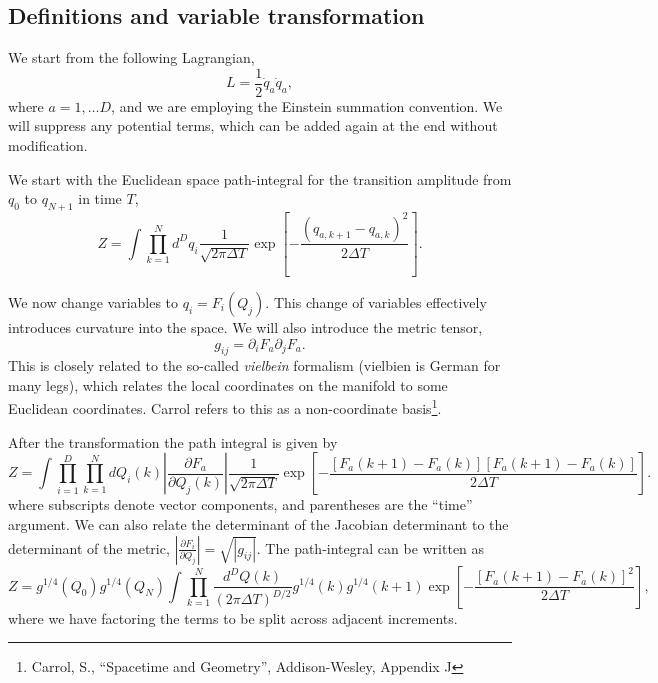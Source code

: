 \subsection{Definitions and variable transformation}
We start from the following Lagrangian,
\begin{equation}
L = \frac{1}{2}\dot{q}_a\dot{q}_a,
\end{equation}
where $a=1,\ldots D$, and we are employing the Einstein summation convention.  
We will suppress any potential terms, which can be added again at the end 
without modification.  

We start with the Euclidean space path-integral for the transition amplitude
from $q_0$ to $q_{N+1}$ in time $T$,
\begin{equation}
Z = \int \prod_{k=1}^Nd^Dq_i \frac{1}{\sqrt{2\pi\Delta T}}
\exp\left[ - \frac{\left(q_{a,k+1}-q_{a,k}\right)^2}{2\Delta T}\right].
\end{equation}

We now change variables to $q_i = F_i(Q_j)$.  This change of variables
effectively introduces curvature into the space.  
We will also introduce the metric tensor, 
\begin{equation}
g_{ij} = \partial_i F_a \partial_j F_a.
\end{equation}
This is closely related to the so-called \textit{vielbein} formalism 
(vielbien is German for many legs), 
which relates the local coordinates on the manifold to some Euclidean coordinates.
Carrol refers to this as a non-coordinate basis\footnote{Carrol, S., 
``Spacetime and Geometry'', Addison-Wesley, Appendix J}.  

After the transformation the path integral is given by
\begin{equation}
Z = \int \prod_{i=1}^D\prod_{k=1}^NdQ_i(k) \left| \frac{\partial F_a}{\partial Q_{j}(k)}\right|
 \frac{1}{\sqrt{2\pi\Delta T}} \exp\left[ 
- \frac{\left[F_{a}(k+1)-F_a(k)\right]\left[F_{a}(k+1)-F_a(k)\right]}{2\Delta T}\right].
\end{equation}
where subscripts denote vector components, and parentheses are the ``time'' argument. 
 We can also relate the determinant of the Jacobian determinant to the determinant of the metric,
 $\left|\frac{\partial F_i}{\partial Q_j}\right| = \sqrt{|g_{ij}|}$.  The path-integral
can be written as
\begin{equation}
Z = g^{1/4}(Q_0)g^{1/4}(Q_N)\int \prod_{k=1}^N\frac{d^DQ(k)}{(2\pi\Delta T)^{D/2}} 
g^{1/4}(k)g^{1/4}(k+1) \exp\left[ - \frac{\left[F_{a}(k+1)-F_a(k)\right]^2}{2\Delta T}\right],
\end{equation}
where we have factoring the terms to be split across adjacent increments.  

